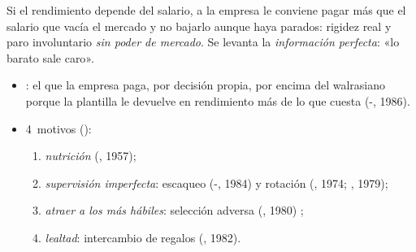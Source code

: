 \documentclass{article}
\begin{document}
\begin{columnas}
\begin{ideaclave}
Si el rendimiento depende del salario, a la empresa le conviene pagar más que el salario que vacía el mercado y no bajarlo aunque haya parados: rigidez real y paro involuntario \emph{sin poder de mercado}. Se levanta la \emph{información perfecta}: «lo barato sale caro».
\end{ideaclave}

\begin{itemize}
\item {}: el que la empresa paga, por decisión propia, por encima del walrasiano porque la plantilla le devuelve en rendimiento más de lo que cuesta (-, 1986).
\item 4~motivos ():
  \begin{enumerate}
  \item \emph{nutrición} (, 1957);
  \item \emph{supervisión imperfecta}: escaqueo (-, 1984) y rotación (, 1974; , 1979);
  \item \emph{atraer a los más hábiles}: selección adversa (, 1980) ;
  \item \emph{lealtad}: intercambio de regalos (, 1982).
  \end{enumerate}
\end{itemize}


\end{columnas}
\end{document}
